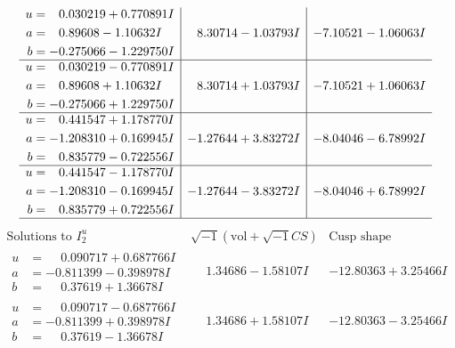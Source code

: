 \documentclass[1p]{elsarticle_modified}
\theoremstyle{definition}
\newcommand{\I}{\sqrt{-1}}
\begin{document}
$$\begin{array}{c|c|c}
\begin{aligned}
u &= \phantom{-}0.030219 + 0.770891 I \\
a &= \phantom{-}0.89608 - 1.10632 I \\
b &= -0.275066 - 1.229750 I\end{aligned}
 & \phantom{-}8.30714 - 1.03793 I & -7.10521 - 1.06063 I \\ \hline\begin{aligned}
u &= \phantom{-}0.030219 - 0.770891 I \\
a &= \phantom{-}0.89608 + 1.10632 I \\
b &= -0.275066 + 1.229750 I\end{aligned}
 & \phantom{-}8.30714 + 1.03793 I & -7.10521 + 1.06063 I \\ \hline\begin{aligned}
u &= \phantom{-}0.441547 + 1.178770 I \\
a &= -1.208310 + 0.169945 I \\
b &= \phantom{-}0.835779 - 0.722556 I\end{aligned}
 & -1.27644 + 3.83272 I & -8.04046 - 6.78992 I \\ \hline\begin{aligned}
u &= \phantom{-}0.441547 - 1.178770 I \\
a &= -1.208310 - 0.169945 I \\
b &= \phantom{-}0.835779 + 0.722556 I\end{aligned}
 & -1.27644 - 3.83272 I & -8.04046 + 6.78992 I\\
 \hline 
 \end{array}$$\newpage$$\begin{array}{c|c|c}  
\text{Solutions to }I^u_{2}& \I (\text{vol} + \sqrt{-1}CS) & \text{Cusp shape}\\
 \hline 
\begin{aligned}
u &= \phantom{-}0.090717 + 0.687766 I \\
a &= -0.811399 - 0.398978 I \\
b &= \phantom{-}0.37619 + 1.36678 I\end{aligned}
 & \phantom{-}1.34686 - 1.58107 I & -12.80363 + 3.25466 I \\ \hline\begin{aligned}
u &= \phantom{-}0.090717 - 0.687766 I \\
a &= -0.811399 + 0.398978 I \\
b &= \phantom{-}0.37619 - 1.36678 I\end{aligned}
 & \phantom{-}1.34686 + 1.58107 I & -12.80363 - 3.25466 I \\ \hline\begin{aligned}

\end{aligned}
\end{array}$$
\end{document}
